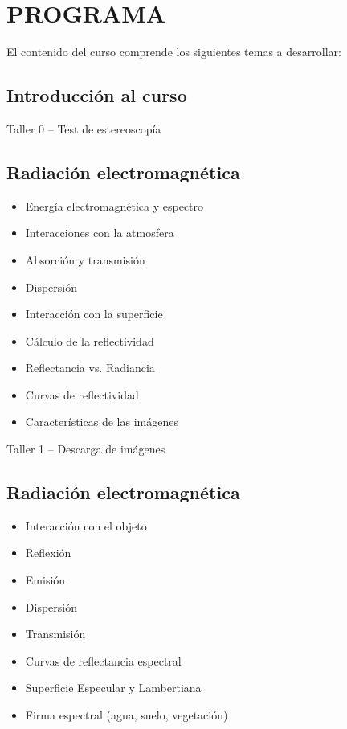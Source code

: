\documentclass[a4paper,twoside,11pt,]{article}
\begin{document}
\section{PROGRAMA}
El contenido del curso comprende los siguientes temas a desarrollar:\\

\subsection*{Introducción al curso}

\begin{tcolorbox}[enhanced,width=5in,center upper,  fontupper=\large\bfseries,drop shadow southwest,sharp corners]
Taller 0 -- Test de estereoscopía
\end{tcolorbox}

\subsection {Radiación electromagnética}
\begin{itemize}
\item Energía electromagnética y espectro
\item Interacciones con la atmosfera
\item Absorción y transmisión
\item Dispersión
\item Interacción con la superficie
\item Cálculo de la reflectividad
\item Reflectancia vs. Radiancia
\item Curvas de reflectividad
\item Características de las imágenes
\end{itemize}

\begin{tcolorbox}[enhanced,width=5in,center upper,  fontupper=\large\bfseries,drop shadow southwest,sharp corners]
Taller 1 -- Descarga de imágenes
\end{tcolorbox}

\subsection {Radiación electromagnética}
\begin{itemize}
\item Interacción con el objeto
\item Reflexión
\item Emisión
\item Dispersión
\item Transmisión
\item Curvas de reflectancia espectral
\item Superficie Especular y Lambertiana
\item Firma espectral (agua, suelo, vegetación)
\end{itemize}
\end{document}
